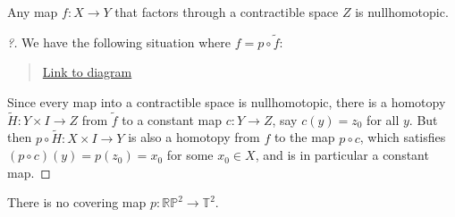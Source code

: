 \begin{corollary}

Any map \(f:X\to Y\) that factors through a contractible space \(Z\) is
nullhomotopic.

\end{corollary}

\begin{proof}[?]

We have the following situation where \(f = p \circ \tilde f\):

\begin{center}
\end{center}

\begin{quote}
\href{https://q.uiver.app/?q=WzAsMyxbMCwyLCJZIl0sWzIsMiwiWCJdLFsyLDAsIloiXSxbMiwxLCJwIl0sWzAsMiwiXFx0aWxkZSBmIiwwLHsic3R5bGUiOnsiYm9keSI6eyJuYW1lIjoiZGFzaGVkIn19fV0sWzAsMSwiZiIsMl1d}{Link
to diagram}
\end{quote}

Since every map into a contractible space is nullhomotopic, there is a
homotopy \(\tilde H: Y\times I \to Z\) from \(\tilde f\) to a constant
map \(c: Y\to Z\), say \(c(y) = z_0\) for all \(y\). But then
\(p\circ \tilde H: X \times I \to Y\) is also a homotopy from \(f\) to
the map \(p\circ c\), which satisfies \((p\circ c)(y) = p(z_0) = x_0\)
for some \(x_0 \in X\), and is in particular a constant map.

\end{proof}

\begin{proposition}

There is no covering map \(p: {\mathbb{RP}}^2 \to {\mathbb{T}}^2\).

\end{proposition}

